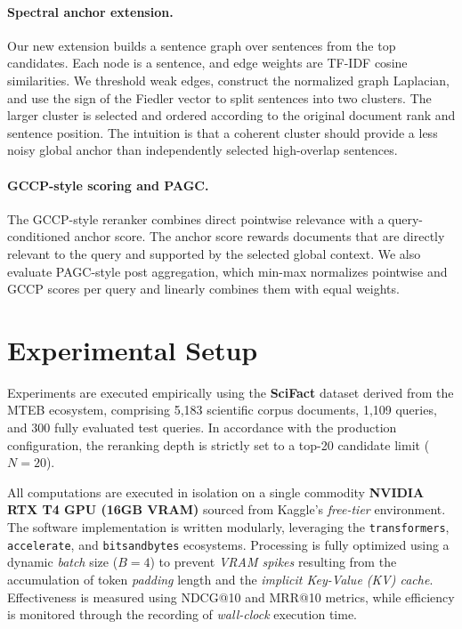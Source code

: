 \documentclass[11pt]{article}
\begin{document}
\paragraph{Spectral anchor extension.}
Our new extension builds a sentence graph over sentences from the top candidates. Each node is a sentence, and edge weights are TF-IDF cosine similarities. We threshold weak edges, construct the normalized graph Laplacian, and use the sign of the Fiedler vector to split sentences into two clusters. The larger cluster is selected and ordered according to the original document rank and sentence position. The intuition is that a coherent cluster should provide a less noisy global anchor than independently selected high-overlap sentences.

\paragraph{GCCP-style scoring and PAGC.}
The GCCP-style reranker combines direct pointwise relevance with a query-conditioned anchor score. The anchor score rewards documents that are directly relevant to the query and supported by the selected global context. We also evaluate PAGC-style post aggregation, which min-max normalizes pointwise and GCCP scores per query and linearly combines them with equal weights.

\section{Experimental Setup}
Experiments are executed empirically using the \textbf{SciFact} dataset derived from the MTEB ecosystem, comprising 5,183 scientific corpus documents, 1,109 queries, and 300 fully evaluated test queries. In accordance with the production configuration, the reranking depth is strictly set to a top-20 candidate limit ($N=20$).

All computations are executed in isolation on a single commodity \textbf{NVIDIA RTX T4 GPU (16GB VRAM)} sourced from Kaggle's \textit{free-tier} environment. The software implementation is written modularly, leveraging the \texttt{transformers}, \texttt{accelerate}, and \texttt{bitsandbytes} ecosystems. Processing is fully optimized using a dynamic \textit{batch} size ($B=4$) to prevent \textit{VRAM spikes} resulting from the accumulation of token \textit{padding} length and the \textit{implicit Key-Value (KV) cache}. Effectiveness is measured using NDCG@10 and MRR@10 metrics, while efficiency is monitored through the recording of \textit{wall-clock} execution time.
\end{document}
